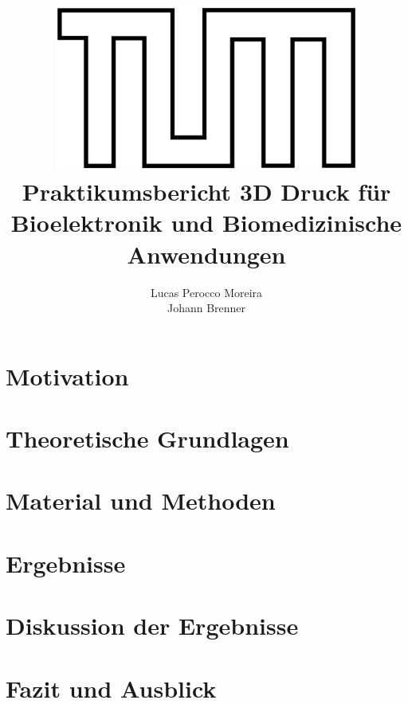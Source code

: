 \documentclass[12pt,a4paper,oneside,ngerman]{article}
\begin{document}
\thispagestyle{empty}


    \title{\vspace{15mm}\centering\includegraphics[width = 100mm]{img/tum_logo.eps}
		\\[3\baselineskip]
		\textbf{\Huge Praktikumsbericht 3D Druck für Bioelektronik und Biomedizinische Anwendungen}}
	
	\author{\vspace{10mm}Lucas Perocco Moreira\\Johann Brenner}
	\date{\vspace{15mm}{\small Sommersemester 2019}}
	\maketitle
    \clearpage
    \tableofcontents
    \clearpage
    
    
    \section{Motivation}
    
    
    \clearpage
    \section{Theoretische Grundlagen}
    
    
    \clearpage
    \section{Material und Methoden}
    
    
    
    
    \clearpage
    \section{Ergebnisse}
    
    
    \clearpage
    \section{Diskussion der Ergebnisse}
    
    
    \clearpage
    \section{Fazit und Ausblick}
    
    
    \clearpage
    

    \clearpage



\clearpage
\listoffigures
\end{document}
